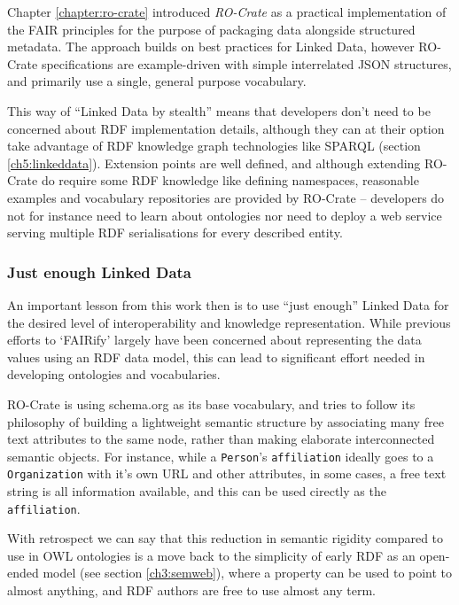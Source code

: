 Chapter \vref{chapter:ro-crate} introduced \emph{RO-Crate} as a practical implementation of the FAIR principles for the purpose of packaging data alongside structured metadata.
The approach builds on best practices for Linked Data, however RO-Crate specifications are example-driven with simple interrelated JSON structures, and primarily use a single, general purpose vocabulary. 

This way of ``Linked Data by stealth'' means that developers don't need to be concerned about RDF implementation details, although they can at their option take advantage of RDF knowledge graph technologies like SPARQL (section \vref{ch5:linkeddata}).
Extension points are well defined, and although extending RO-Crate do require some RDF knowledge like defining namespaces, reasonable examples and vocabulary repositories are provided by RO-Crate --  developers do not for instance need to learn about ontologies nor need to deploy a web service serving multiple RDF serialisations for every described entity.



\subsubsection{Just enough Linked Data}
\label{ch61:justenough}

An important lesson from this work then is to use ``just enough'' Linked Data for the desired level of interoperability and knowledge representation.
While previous efforts to `FAIRify' largely have been concerned about representing the data values using an RDF data model, this can lead to significant effort needed in developing ontologies and vocabularies. 

RO-Crate is using schema.org \cite{schema.org} as its base vocabulary, and tries to follow its philosophy of building a lightweight semantic structure by associating many free text attributes to the same node, rather than making elaborate interconnected semantic objects.
For instance, while a \texttt{Person}'s \texttt{affiliation} ideally goes to a \texttt{Organization} with it's own URL and other attributes, in some cases, a free text string is all information available, and this can be used cirectly as the \texttt{affiliation}. 

With retrospect we can say that this reduction in semantic rigidity compared to use in OWL ontologies is a move back to the simplicity of early RDF as an open-ended model (see section \vref{ch3:semweb}), where a property can be used to point to almost anything, and RDF authors are free to use almost any term.

